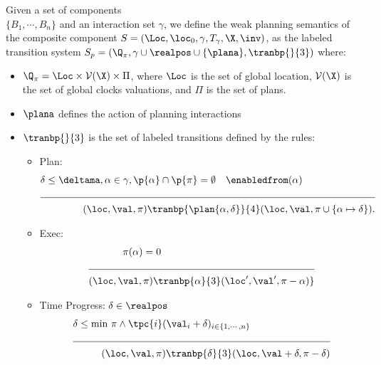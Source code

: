 \begin{definition}\label{def:plan}
Given a set of components\\ $\{B_1,\cdots,B_n\}$ and an interaction set $\gamma$,
we define the weak planning semantics of the composite component $S = (\Loc,\loc_0,\gamma,T_{\gamma},\X,\inv)$,
as the labeled transition system $S_p=(\Q_{\pi},
\gamma\cup\realpos\cup\{\plana\},\tranbp{}{3})$ where:
\begin{itemize}
  \item $\Q_{\pi}=\Loc\times\mathcal{V}(\X)\times\Pi$, where $\Loc$ is the set of global location,
    $\mathcal{V}(\X)$ is the set of global clocks valuations, and $\Pi$ is the set of plans.
  \item $\plana$ defines the action of planning interactions
  \item $\tranbp{}{3}$ is the set of labeled transitions defined by the rules:
  \begin{itemize}
    \item Plan:
    \begin{align*}
      &\delta\le\deltama,\alpha\in\gamma,\p{\alpha}\cap\p{\pi}=\emptyset\quad\enabledfrom(\alpha)\\
     \cline{1-2}
     &\hspace{1.5cm}(\loc,\val,\pi)\tranbp{\plan{\alpha,\delta}}{4}(\loc,\val,\pi\cup\{\alpha\mapsto\delta\}).\\
    \end{align*}
    \vspace*{-10mm}

    \item Exec:
     \begin{align*}
       &\hspace{12mm}\pi(\alpha)=0\\
            \cline{1-2}
          &(\loc,\val,\pi)\tranbp{\alpha}{3}(\loc',\val',\pi-\alpha)\}\\
        \end{align*}
  \item Time Progress: $\delta\in\realpos$
      \begin{align*}
        &\delta\le \text{min } \pi
        \wedge\tpc{i}(\val_i+\delta)_{i\in\{1,\cdots,n\}}\\
        \cline{1-2}
        &\hspace{1cm}(\loc,\val,\pi)\tranbp{\delta}{3}(\loc,\val+\delta,\pi-\delta)\\
          \end{align*}
  \end{itemize}
  \end{itemize}
\end{definition}
